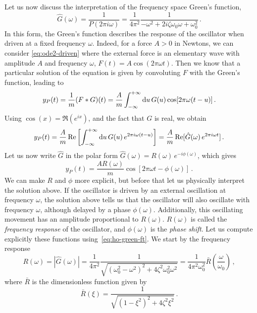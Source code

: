 Let us now discuss the interpretation of the frequency space Green's function, \ie
\begin{equation}
  \boxed{
    \hat{G}(\omega)=\frac{1}{P(2\pi i\omega)}=\frac{1}{4\pi^2}
  \frac{1}{-\omega^2+2i\zeta\omega_0\omega+\omega_0^2}}\,.
  \label{eq:ho-green-ft}
\end{equation}
In this form, the Green's function describes the response of the oscillator when driven at
a fixed frequency $\omega$. Indeed, for a force $A>0$ in Newtons, we can consider
\cref{eq:ode2-driven} where the external force is an elementary wave with amplitude $A$
and frequency $\omega$, \ie $F(t)=A\cos(2\pi\omega t)$. Then we know that a particular
solution of the equation is given by convoluting $F$ with the Green's function, leading to
\begin{equation}
  y_P(t)=\frac{1}{m}(F\ast G)(t)=\frac{A}{m}\int_{-\infty}^{+\infty}\mathrm{d}{u}\,G(u)\cos[2\pi\omega(t-u)]\,.
\end{equation}
Using $\cos(x)=\Re(e^{ix})$, and the fact that $G$ is real, we obtain
\begin{equation}
  y_P(t)=\frac{A}{m}\operatorname{Re}\left[\int_{-\infty}^{+\infty}\mathrm{d}{u}\,G(u)\,e^{2\pi i\omega(t-u)}\right]
  =\frac{A}{m}\operatorname{Re}[\hat{G}(\omega)\,e^{2\pi i\omega t}]\,.
\end{equation}
Let us now write $\hat{G}$ in the polar form
$\hat{G}(\omega)=R(\omega)\,e^{-i\phi(\omega)}$, which gives
\begin{equation}
  y_P(t)=\frac{AR(\omega)}{m}\cos[2\pi\omega t-\phi(\omega)]\,.
\end{equation}
We can make $R$ and $\phi$ more explicit, but before that let us physically interpret the
solution above. If the oscillator is driven by an external oscillation at frequency
$\omega$, the solution above tells us that the oscillator will also oscillate with
frequency $\omega$, although delayed by a phase $\phi(\omega)$. Additionally, this
oscillating movement has an amplitude proportional to $R(\omega)$. $R(\omega)$ is called
the \emph{frequency response} of the oscillator, and $\phi(\omega)$ is the \emph{phase
shift}. Let us compute explicitly these functions using~\cref{eq:ho-green-ft}. We start by
the frequency response
\begin{equation}
  R(\omega)=|\hat{G}(\omega)|=\frac{1}{4\pi^2}
  \frac{1}{\sqrt{(\omega_0^2-\omega^2)^2+4\zeta^2\omega_0^2\omega^2}}
  =\frac{1}{4\pi^2\omega_0^2}\bar{R}\left(\frac{\omega}{\omega_0}\right)\,,
\end{equation}
where $\bar{R}$ is the dimensionless function given by
\begin{equation}
  \boxed{
  \bar{R}(\xi)=\frac{1}{\sqrt{(1-\xi^2)^2+4\zeta^2\xi^2}}\,.}
  \label{eq:ho-response}
\end{equation}
